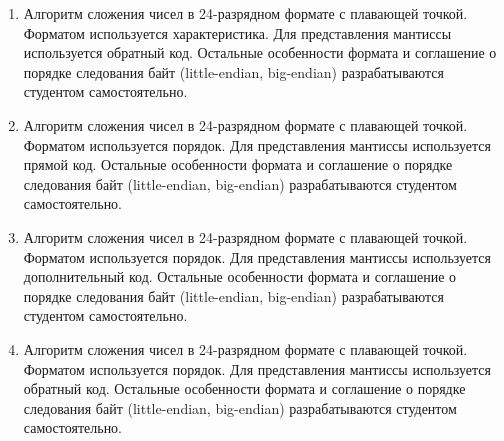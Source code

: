 \begin{enumerate}
    \item Алгоритм сложения чисел в 24-разрядном формате с плавающей точкой. Форматом используется характеристика. Для представления мантиссы используется обратный код. Остальные особенности формата и соглашение о порядке следования байт (little-endian, big-endian) разрабатываются студентом самостоятельно.
    \item Алгоритм сложения чисел в 24-разрядном формате с плавающей точкой. Форматом используется порядок. Для представления мантиссы используется прямой код. Остальные особенности формата и соглашение о порядке следования байт (little-endian, big-endian) разрабатываются студентом самостоятельно.
    \item Алгоритм сложения чисел в 24-разрядном формате с плавающей точкой. Форматом используется порядок. Для представления мантиссы используется дополнительный код. Остальные особенности формата и соглашение о порядке следования байт (little-endian, big-endian) разрабатываются студентом самостоятельно.
    \item Алгоритм сложения чисел в 24-разрядном формате с плавающей точкой. Форматом используется порядок. Для представления мантиссы используется обратный код. Остальные особенности формата и соглашение о порядке следования байт (little-endian, big-endian) разрабатываются студентом самостоятельно.
\end{enumerate}

